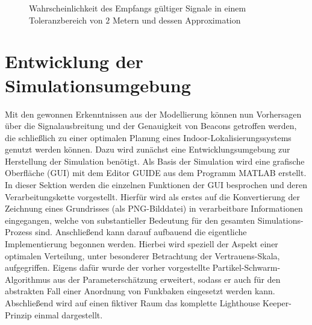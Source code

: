 \begin{figure}[H] 
\centering
{}
\caption{Wahrscheinlichkeit des Empfangs gültiger Signale in einem Toleranzbereich von $2$ Metern und dessen Approximation}
\label{fig:GueteSauelengraph2}
\end{figure} 
\section{Entwicklung der Simulationsumgebung}
Mit den gewonnen Erkenntnissen aus der Modellierung können nun Vorhersagen über die Signalausbreitung und der Genauigkeit von Beacons getroffen werden, die schließlich zu einer optimalen Planung eines Indoor-Lokalisierungssystems genutzt werden können. Dazu wird zunächst eine Entwicklungsumgebung zur Herstellung der Simulation benötigt. Als Basis der Simulation wird eine grafische Oberfläche (GUI) mit dem Editor GUIDE aus dem Programm MATLAB \cite{GUIDE} erstellt. In dieser Sektion werden die einzelnen Funktionen der GUI besprochen und deren Verarbeitungskette vorgestellt. Hierfür wird als erstes auf die Konvertierung der Zeichnung eines Grundrisses (als PNG-Bilddatei) in verarbeitbare Informationen eingegangen, welche von substantieller Bedeutung für den gesamten Simulations-Prozess sind. Anschließend kann darauf aufbauend die eigentliche Implementierung begonnen werden. Hierbei wird speziell der Aspekt einer optimalen Verteilung, unter besonderer Betrachtung der Vertrauens-Skala, aufgegriffen. Eigens dafür wurde der vorher vorgestellte Partikel-Schwarm-Algorithmus aus der Parameterschätzung erweitert, sodass er auch für den abstrakten Fall einer Anordnung von Funkbaken eingesetzt werden kann. Abschließend wird auf einen fiktiver Raum das komplette Lighthouse Keeper-Prinzip einmal dargestellt.  

